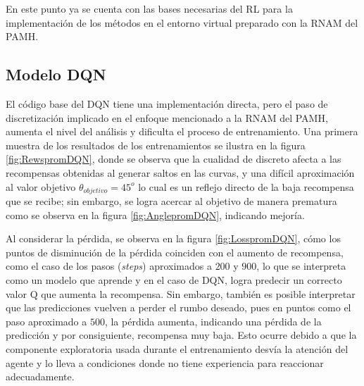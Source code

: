 En este punto ya se cuenta con las bases necesarias del RL para la implementación de los métodos en el entorno virtual preparado con la RNAM del PAMH.

\subsection{Modelo DQN}

El código base del DQN tiene una implementación directa, pero el paso de discretización implicado en el enfoque mencionado a la RNAM del PAMH, aumenta el nivel del análisis y dificulta el proceso de entrenamiento. Una primera muestra de los resultados de los entrenamientos se ilustra en la figura \ref{fig:RewspromDQN}, donde se observa que la cualidad de discreto afecta a las recompensas obtenidas al generar saltos en las curvas, y una difícil aproximación al valor objetivo $\theta_{objetivo}=45^o$ lo cual es un reflejo directo de la baja recompensa que se recibe; sin embargo, se logra acercar al objetivo de manera prematura como se observa en la figura \ref{fig:AnglepromDQN}, indicando mejoría.

Al considerar la pérdida, se observa en la figura \ref{fig:LosspromDQN}, cómo los puntos de disminución de la pérdida coinciden con el aumento de recompensa, como el caso de los pasos (\textit{steps}) aproximados a $200$ y $900$, lo que se interpreta como un modelo que aprende y en el caso de DQN, logra predecir un correcto valor Q que aumenta la recompensa. Sin embargo, también es posible interpretar que las predicciones vuelven a perder el rumbo deseado, pues en puntos como el paso aproximado a $500$, la pérdida aumenta, indicando una pérdida de la predicción y por consiguiente, recompensa muy baja. Esto ocurre debido a que la componente exploratoria usada durante el entrenamiento desvía la atención del agente y lo lleva a condiciones donde no tiene experiencia para reaccionar adecuadamente.



